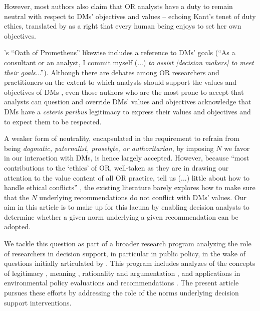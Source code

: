 \documentclass[preprint, french, english, 11pt, authoryear]{elsarticle}%
\newcommand{\possessivecite}[1]{\citeauthor{#1}’s \citeyearpar{#1}}
\begin{document}
However, most authors also claim that \ac{OR} 
analysts have a duty to remain neutral with respect to \acp{DM}' objectives and values
-- echoing Kant’s tenet of duty ethics, translated by \citet{reisach_creation_2016} as a right that every human being enjoys to set her own objectives.
\begin{changebar}\possessivecite{brans_or_2002} ``Oath of Prometheus'' likewise includes a reference to \acp{DM}' goals 
(``As a consultant or an analyst, I commit myself (...) \emph{to assist [decision makers] to meet their goals}...'').
Although there are debates among \ac{OR} researchers and practitioners on the extent to which analysts should support the values and objectives of \acp{DM} \citep{brans_ethics_2007}, even those authors who are the most prone to accept that analysts can question and override \acp{DM}' values and objectives acknowledge that \acp{DM} have a \emph{ceteris paribus} legitimacy to express their values and objectives and to expect them to be respected.
\end{changebar}A weaker form of neutrality, encapsulated in the requirement to refrain from being \emph{dogmatic, paternalist, proselyte, or authoritarian}, by imposing $N$ we favor in our interaction with \acp{DM}, is hence largely accepted. However, because ``most contributions to the ‘ethics’ of \ac{OR}, well-taken as they are in drawing our attention to the value content of all \ac{OR} practice, tell us (...) little about how to handle ethical conflicts'' \citep{ormerod_operational_2013},
the existing literature barely explores how to make sure that the $N$ underlying recommendations do not conflict with \acp{DM}' values. Our aim in this article is to make up for this lacuna by enabling decision analysts to determine whether a given norm underlying a given recommendation can be adopted.

We tackle this question as part of a broader research program analyzing the role of researchers in decision support, in particular in public policy, in the wake of questions initially articulated by \citet{tsoukias_policy_2013}.
This program includes analyzes of the concepts of legitimacy \citep{meinard_what_2017}, meaning \citep{meinard_utility_2018}, rationality \citep{meinard_rationality_2019} and argumentation \citep{cailloux_formal_2018}, 
and applications in environmental policy evaluations \citep{jeanmougin_mismatch_2017} and recommendations \citep{choulak_meta-decision-analysis_2019}.
The present article pursues these efforts by addressing the role of the norms underlying decision support interventions.
\end{document}

